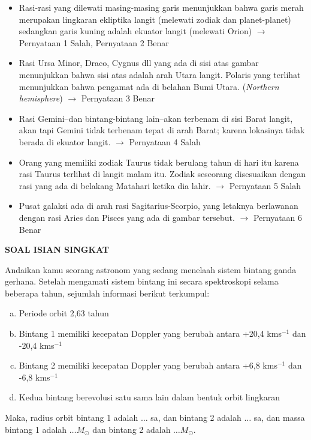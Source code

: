 \documentclass[11pt,fleqn]{exam}
\begin{document}
\begin{questions}
\begin{itemize}
    \item Rasi-rasi yang dilewati masing-masing garis menunjukkan bahwa garis merah merupakan lingkaran ekliptika langit (melewati zodiak dan planet-planet) sedangkan garis kuning adalah ekuator langit (melewati Orion) $\rightarrow$ Pernyataan 1 Salah, Pernyataan 2 Benar
    \item Rasi Ursa Minor, Draco, Cygnus dll yang ada di sisi atas gambar menunjukkan bahwa sisi atas adalah arah Utara langit. Polaris yang terlihat menunjukkan bahwa pengamat ada di belahan Bumi Utara.  (\textit{Northern hemisphere}) $\rightarrow$ Pernyataan 3 Benar
    \item Rasi Gemini\---dan bintang-bintang lain\---akan terbenam di sisi Barat langit, akan tapi Gemini tidak terbenam tepat di arah Barat; karena lokasinya tidak berada di ekuator langit. $\rightarrow$ Pernyataan 4 Salah
    \item Orang yang memiliki zodiak Taurus tidak berulang tahun di hari itu karena rasi Taurus terlihat di langit malam itu. Zodiak seseorang disesuaikan dengan rasi yang ada di belakang Matahari ketika dia lahir. $\rightarrow$ Pernyataan 5 Salah
    \item Pusat galaksi ada di arah rasi Sagitarius-Scorpio, yang letaknya berlawanan dengan rasi Aries dan Pisces yang ada di gambar tersebut. $\rightarrow$ Pernyataan 6 Benar
\end{itemize}


\vspace{1cm}
\textbf{SOAL ISIAN SINGKAT}

\vspace{0.5cm}
\question Andaikan kamu seorang astronom yang sedang menelaah sistem bintang ganda gerhana. Setelah mengamati sistem bintang ini secara spektroskopi selama beberapa tahun, sejumlah informasi berikut terkumpul:
\begin{enumerate}[a.]
    \item Periode orbit 2,63 tahun
    \item Bintang 1 memiliki kecepatan Doppler yang berubah antara +20,4 kms$^{-1}$ dan -20,4 kms$^{-1}$
    \item Bintang 2 memiliki kecepatan Doppler yang berubah antara +6,8 kms$^{-1}$ dan -6,8 kms$^{-1}$
    \item Kedua bintang berevolusi satu sama lain dalam bentuk orbit lingkaran
\end{enumerate}
Maka, radius orbit bintang 1 adalah $\ldots$ sa, dan bintang 2 adalah $\ldots $ sa, dan massa bintang 1 adalah $\ldots M_\odot$ dan bintang 2 adalah $\ldots M_\odot$.



\end{questions}
\end{document}
